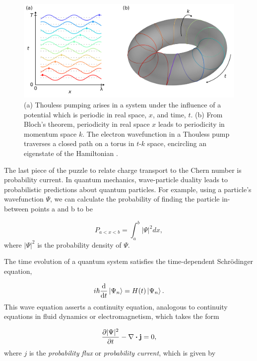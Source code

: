 \documentclass[double,12pt,1in,seploa]{beavtex}
\begin{document}
\begin{figure}
    \includegraphics{Thouless pump fig.png}
    \caption{(a) Thouless pumping arises in a system under the influence of a potential which is periodic in real space, $x$, and time, $t$. (b) From Bloch's theorem, periodicity in real space $x$ leads to periodicity in momentum space $k$. The electron wavefunction in a Thouless pump traverses a closed path on a torus in $t\textrm{-}k$ space, encircling an eigenstate of the Hamiltonian \cite{thouless_quantization_1983}.}
    \label{thouless pump torus}
\end{figure}

The last piece of the puzzle to relate charge transport to the Chern number is probability current. In quantum mechanics, wave-particle duality leads to probabilistic predictions about quantum particles. For example, using a particle's wavefunction $\Psi$, we can calculate the probability of finding the particle in-between points a and b to be 

\begin{equation}
    P_{a<x<b} = \int_{a}^{b} |\Psi|^2dx,
\end{equation}
where $|\Psi|^2$ is the probability density of $\Psi$. 

The time evolution of a quantum system satisfies the time-dependent Schrödinger equation,

\begin{equation}
    i \hbar \derivative{t}\ket{\Psi_n} = H(t)\ket{\Psi_n}.
\end{equation}
This wave equation asserts a continuity equation, analogous to continuity equations in fluid dynamics or electromagnetism, which takes the form \cite{sakurai_modern_1985}

\begin{equation}
    \pdv{|\Psi|^2}{t} -\nabla \dotproduct \vectorbold{j} = 0, \label{continuity eqn for probability}
\end{equation}
where $j$ is the \textit{probability flux} or \textit{probability current}, which is given by
\end{document}
